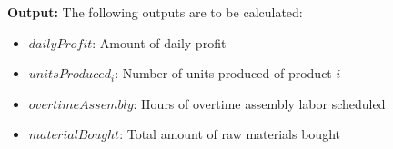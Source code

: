\documentclass{article}
\begin{document}
\textbf{Output:}
The following outputs are to be calculated:
\begin{itemize}
    \item \( dailyProfit \): Amount of daily profit
    \item \( unitsProduced_i \): Number of units produced of product \( i \)
    \item \( overtimeAssembly \): Hours of overtime assembly labor scheduled
    \item \( materialBought \): Total amount of raw materials bought
\end{itemize}
\end{document}
